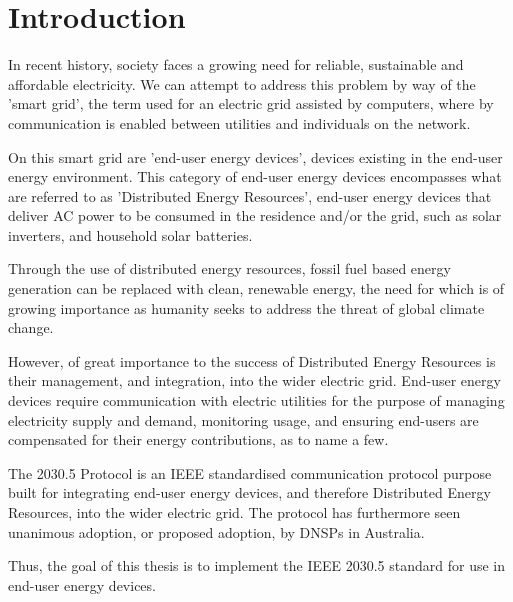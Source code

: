 \chapter{Introduction}\label{ch:intro}
In recent history, society faces a growing need for reliable, sustainable and affordable electricity.
We can attempt to address this problem by way of the 'smart grid', the term used for an electric grid assisted by computers, where by communication is enabled between utilities and individuals on the network.

On this smart grid are 'end-user energy devices', devices existing in the end-user energy environment.
This category of end-user energy devices encompasses what are referred to as 'Distributed Energy Resources',
end-user energy devices that deliver AC power to be consumed in the residence and/or the grid, such as solar inverters, and household solar batteries. \cite{IEEE2030.5}

Through the use of distributed energy resources, fossil fuel based energy generation can be replaced with clean, 
renewable energy, the need for which is of growing importance as humanity seeks to address the threat of global climate change.

However, of great importance to the success of Distributed Energy Resources is their management, and integration, into the wider electric grid.
End-user energy devices require communication with electric utilities for the purpose of managing electricity supply and demand, monitoring usage, 
and ensuring end-users are compensated for their energy contributions, as to name a few.

The 2030.5 Protocol is an IEEE standardised communication protocol purpose built for integrating end-user energy devices, and therefore Distributed Energy Resources, into the wider electric grid.
The protocol has furthermore seen unanimous adoption, or proposed adoption, by DNSPs in Australia.\cite{DOEAdoption}

Thus, the goal of this thesis is to implement the IEEE 2030.5 standard for use in end-user energy devices.


